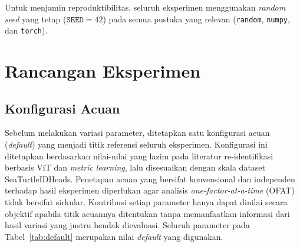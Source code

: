 Untuk menjamin reproduktibilitas, seluruh eksperimen menggunakan \textit{random seed} yang tetap ($\texttt{SEED} = 42$) pada semua pustaka yang relevan (\texttt{random}, \texttt{numpy}, dan \texttt{torch}).

\section{Rancangan Eksperimen}
\subsection{Konfigurasi Acuan}
Sebelum melakukan variasi parameter, ditetapkan satu konfigurasi acuan (\textit{default}) yang menjadi titik referensi seluruh eksperimen. Konfigurasi ini ditetapkan berdasarkan nilai-nilai yang lazim pada literatur re-identifikasi berbasis ViT dan \textit{metric learning}, lalu disesuaikan dengan skala dataset SeaTurtleIDHeads. Penetapan acuan yang bersifat konvensional dan independen terhadap hasil eksperimen diperlukan agar analisis \textit{one-factor-at-a-time} (OFAT) tidak bersifat sirkular. Kontribusi setiap parameter hanya dapat dinilai secara objektif apabila titik acuannya ditentukan tanpa memanfaatkan informasi dari hasil variasi yang justru hendak dievaluasi. Seluruh parameter pada Tabel~\ref{tab:default} merupakan nilai \textit{default} yang digunakan.

